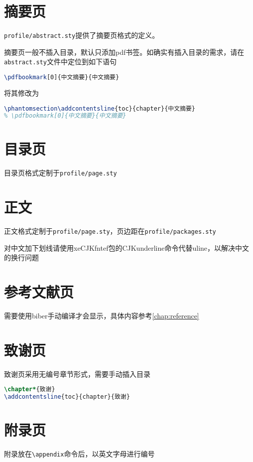 \section{摘要页}

\texttt{profile/abstract.sty}提供了摘要页格式的定义。

摘要页一般不插入目录，默认只添加pdf书签。如确实有插入目录的需求，请在\texttt{abstract.sty}文件中定位到如下语句
\begin{lstlisting}[language=TeX]
% \phantomsection\addcontentsline{toc}{chapter}{中文摘要}
\pdfbookmark[0]{中文摘要}{中文摘要}
\end{lstlisting}
将其修改为
\begin{lstlisting}[language=TeX]
\phantomsection\addcontentsline{toc}{chapter}{中文摘要}
% \pdfbookmark[0]{中文摘要}{中文摘要}
\end{lstlisting}

\section{目录页}

目录页格式定制于\texttt{profile/page.sty}

\section{正文}

正文格式定制于\texttt{profile/page.sty}，页边距在\texttt{profile/packages.sty}

对中文加下划线请使用xeCJKfntef包的CJKunderline命令代替uline，以解决中文的换行问题

\section{参考文献页}

需要使用biber手动编译才会显示，具体内容参考\cref{chap:reference}

\section{致谢页}

致谢页采用无编号章节形式，需要手动插入目录
\begin{lstlisting}[language=TeX]
\chapter*{致谢}
\addcontentsline{toc}{chapter}{致谢}
\end{lstlisting}

\section{附录页}

附录放在\lstinline|\appendix|命令后，以英文字母进行编号
